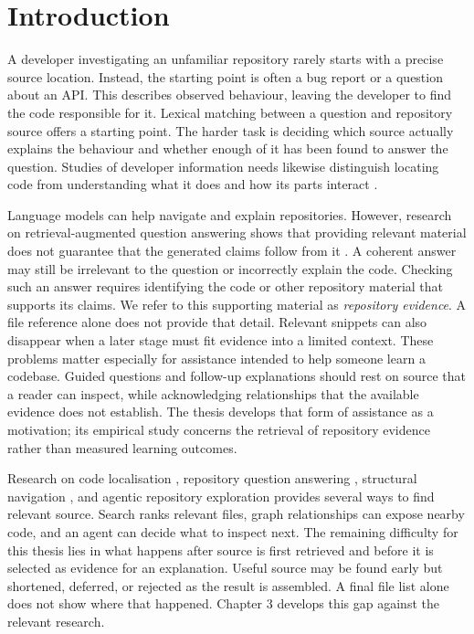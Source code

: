 \chapter{Introduction}\label{ch:introduction}

A developer investigating an unfamiliar repository rarely starts with a precise source location. Instead, the starting point is often a bug report or a question about an API. This describes observed behaviour, leaving the developer to find the code responsible for it. Lexical matching between a question and repository source offers a starting point. The harder task is deciding which source actually explains the behaviour and whether enough of it has been found to answer the question. Studies of developer information needs likewise distinguish locating code from understanding what it does and how its parts interact \textcite{Ko2007InformationNeeds,Sillito2008ProgrammingQuestions}.

Language models can help navigate and explain repositories. However, research on retrieval-augmented question answering shows that providing relevant material does not guarantee that the generated claims follow from it \textcite{Gao2023ALCE}. A coherent answer may still be irrelevant to the question or incorrectly explain the code. Checking such an answer requires identifying the code or other repository material that supports its claims. We refer to this supporting material as \emph{repository evidence}. A file reference alone does not provide that detail. Relevant snippets can also disappear when a later stage must fit evidence into a limited context. These problems matter especially for assistance intended to help someone learn a codebase. Guided questions and follow-up explanations should rest on source that a reader can inspect, while acknowledging relationships that the available evidence does not establish. The thesis develops that form of assistance as a motivation; its empirical study concerns the retrieval of repository evidence rather than measured learning outcomes.

Research on code localisation \textcite{Zhou2012BugLocator}, repository question answering \textcite{Peng2026SWEQA}, structural navigation \textcite{Petrenko2013DepIR}, and agentic repository exploration \textcite{Kang2024AutoFL} provides several ways to find relevant source. Search ranks relevant files, graph relationships can expose nearby code, and an agent can decide what to inspect next. The remaining difficulty for this thesis lies in what happens after source is first retrieved and before it is selected as evidence for an explanation. Useful source may be found early but shortened, deferred, or rejected as the result is assembled. A final file list alone does not show where that happened. Chapter 3 develops this gap against the relevant research.

